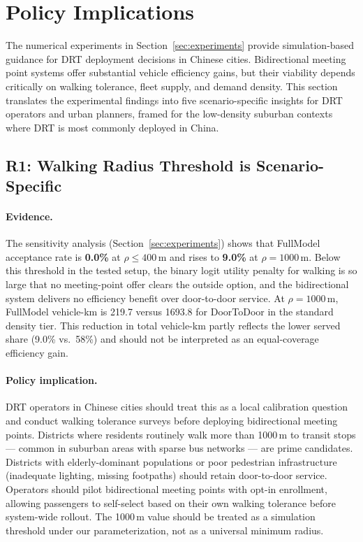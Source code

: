
\section{Policy Implications}\label{sec:policy}

The numerical experiments in Section~\ref{sec:experiments} provide
simulation-based guidance for DRT deployment decisions in Chinese cities.
Bidirectional meeting point systems offer substantial vehicle efficiency
gains, but their viability depends critically on walking tolerance, fleet
supply, and demand density. This section translates the experimental
findings into five scenario-specific insights for DRT operators and urban
planners, framed for the low-density suburban contexts where DRT is most
commonly deployed in China.

\subsection{R1: Walking Radius Threshold is Scenario-Specific}

\paragraph{Evidence.}
The sensitivity analysis (Section~\ref{sec:experiments}) shows that
FullModel acceptance rate is \textbf{0.0\%} at $\rho \leq 400$\,m and
rises to \textbf{9.0\%} at $\rho = 1000$\,m. Below this threshold in the tested setup,
the binary logit utility penalty for walking is so large that no meeting-point offer
clears the outside option, and the bidirectional system delivers no
efficiency benefit over door-to-door service. At $\rho = 1000$\,m, FullModel vehicle-km is 219.7 versus 1693.8 for
DoorToDoor in the standard density tier. This reduction in total vehicle-km
partly reflects the lower served share (9.0\% vs.\ 58\%) and should not be
interpreted as an equal-coverage efficiency gain.

\paragraph{Policy implication.}
DRT operators in Chinese cities should treat this as a local calibration question and conduct walking tolerance surveys
before deploying bidirectional meeting points. Districts where residents
routinely walk more than 1000\,m to transit stops --- common in suburban
areas with sparse bus networks --- are prime candidates. Districts with
elderly-dominant populations or poor pedestrian infrastructure (inadequate
lighting, missing footpaths) should retain door-to-door service. Operators
should pilot bidirectional meeting points with opt-in enrollment, allowing
passengers to self-select based on their own walking tolerance before
system-wide rollout. The 1000\,m value should be treated as a simulation
threshold under our parameterization, not as a universal minimum radius.


